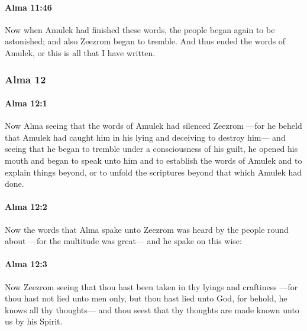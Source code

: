 		\paragraph{Alma 11:46} %
			\label{ALMA-11-46}

			Now when Amulek had finished these words,
			the people began again to be astonished;
			and also Zeezrom began to tremble.
			And thus ended the words of Amulek,
			or this is all that I have written.

	\subsubsection{Alma 12} %
		\label{ALMA-12}
		
		\paragraph{Alma 12:1} %
			\label{ALMA-12-1}

			Now Alma seeing that the words of Amulek had silenced Zeezrom
			---for he beheld that Amulek had caught him
			in his lying and deceiving to destroy him---
			and seeing that he began to tremble under a consciousness of his guilt,
			he opened his mouth and began to speak unto him
			and to establish the words of Amulek and to explain things beyond,
			or to unfold the scriptures beyond that which Amulek had done.

		\paragraph{Alma 12:2} %
			\label{ALMA-12-2}

			Now the words that Alma spake unto Zeezrom was heard
			by the people round about
			---for the multitude was great---
			and he spake on this wise:

		\paragraph{Alma 12:3} %
			\label{ALMA-12-3}

			Now Zeezrom seeing that thou hast been taken in thy lyings and craftiness
			---for thou hast not lied unto men only, but thou hast lied unto God,
			for behold, he knows all thy thoughts---
			and thou seest that thy thoughts are made known unto us by his Spirit.

